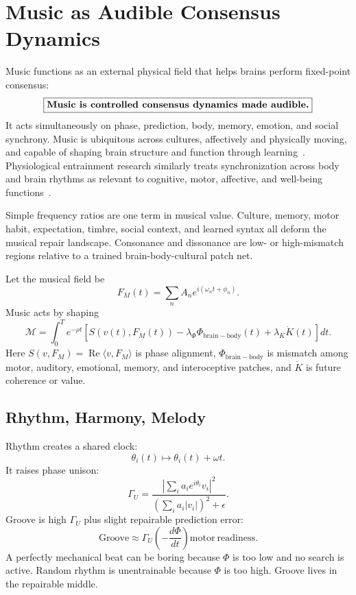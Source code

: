 \documentclass[11pt]{article}
\theoremstyle{remark}
\theoremstyle{plain}
\begin{document}
\section{Music as Audible Consensus Dynamics}

Music functions as an external physical field that helps brains perform fixed-point consensus:
\[
\boxed{
\text{\bfseries Music is controlled consensus dynamics made audible.}
}
\]
It acts simultaneously on phase, prediction, body, memory, emotion, and social synchrony. Music is ubiquitous across cultures, affectively and physically moving, and capable of shaping brain structure and function through learning~\cite{Vuust2022}. Physiological entrainment research similarly treats synchronization across body and brain rhythms as relevant to cognitive, motor, affective, and well-being functions~\cite{PhysiologicalEntrainment2025}.

Simple frequency ratios are one term in musical value. Culture, memory, motor habit, expectation, timbre, social context, and learned syntax all deform the musical repair landscape. Consonance and dissonance are low- or high-mismatch regions relative to a trained brain-body-cultural patch net.

Let the musical field be
\[
F_M(t)=
\sum_n A_n e^{i(\omega_n t+\phi_n)}.
\]
Music acts by shaping
\[
\boxed{
\mathcal M
=
\int_0^T e^{-\rho t}
\left[
S(v(t),F_M(t))
-
\lambda_\Phi\Phi_{\mathrm{brain-body}}(t)
+
\lambda_K\dot K(t)
\right]dt.
}
\]
Here \(S(v,F_M)=\operatorname{Re}\langle v,F_M\rangle\) is phase alignment, \(\Phi_{\mathrm{brain-body}}\) is mismatch among motor, auditory, emotional, memory, and interoceptive patches, and \(\dot K\) is future coherence or value.

\subsection{Rhythm, Harmony, Melody}

Rhythm creates a shared clock:
\[
\theta_i(t)\mapsto\theta_i(t)+\omega t.
\]
It raises phase unison:
\[
\Gamma_U
=
\frac{
\left|\sum_i a_i e^{i\theta_i}v_i\right|^2
}{
\left(\sum_i a_i|v_i|\right)^2+\epsilon
}.
\]
Groove is high \(\Gamma_U\) plus slight repairable prediction error:
\[
\mathrm{Groove}
\approx
\Gamma_U
\left(-\frac{d\Phi}{dt}\right)
\mathrm{motor\ readiness}.
\]
A perfectly mechanical beat can be boring because \(\Phi\) is too low and no search is active. Random rhythm is unentrainable because \(\Phi\) is too high. Groove lives in the repairable middle.
\end{document}

